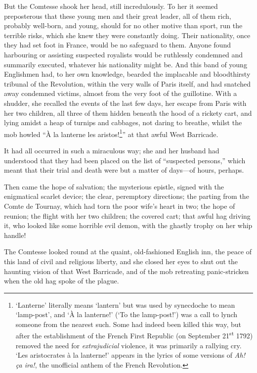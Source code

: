 \documentclass[paper=5.5in:8.5in,BCOR=7mm,twoside,DIV=calc,12pt,usegeometry,chapterprefix,endperiod,headings=big]{scrbook}
\begin{document}
But the Comtesse shook her head, still incredulously. To her it seemed preposterous that these young men and their great leader, all of them rich, probably well-born, and young, should for no other motive than sport, run the terrible risks, which she knew they were constantly doing. Their nationality, once they had set foot in France, would be no safeguard to them. Anyone found harbouring or assisting suspected royalists would be ruthlessly condemned and summarily executed, whatever his nationality might be. And this band of young Englishmen had, to her own knowledge, bearded the implacable and bloodthirsty tribunal of the Revolution, within the very walls of Paris itself, and had snatched away condemned victims, almost from the very foot of the guillotine. With a shudder, she recalled the events of the last few days, her escape from Paris with her two children, all three of them hidden beneath the hood of a rickety cart, and lying amidst a heap of turnips and cabbages, not daring to breathe, whilst the mob howled \enquote{À la lanterne les aristos!\footnote{\enquote{Lanterne} literally means \enquote{lantern} but was used by synecdoche to mean  \enquote{lamp-post}, and \enquote{À la lanterne!} (\enquote{To the lamp-post!}) was a call to lynch someone from the nearest such. Some had indeed been killed this way, but after the establishment of the French First Republic (on September 21\textsuperscript{st} 1792) removed the need for \textit{extrajudicial} violence, it was primarily a rallying cry. \enquote{Les aristocrates à la lanterne!} appears in the lyrics of some versions of \textit{Ah! ça ira!}, the unofficial anthem of the French Revolution.}} at that awful West Barricade.

It had all occurred in such a miraculous way; she and her husband had understood that they had been placed on the list of \enquote{suspected persons,} which meant that their trial and death were but a matter of days---of hours, perhaps.

Then came the hope of salvation; the mysterious epistle, signed with the enigmatical scarlet device; the clear, peremptory directions; the parting from the Comte de Tournay, which had torn the poor wife's heart in two; the hope of reunion; the flight with her two children; the covered cart; that awful hag driving it, who looked like some horrible evil demon, with the ghastly trophy on her whip handle!

The Comtesse looked round at the quaint, old-fashioned English inn, the peace of this land of civil and religious liberty, and she closed her eyes to shut out the haunting vision of that West Barricade, and of the mob retreating panic-stricken when the old hag spoke of the plague.
\end{document}
